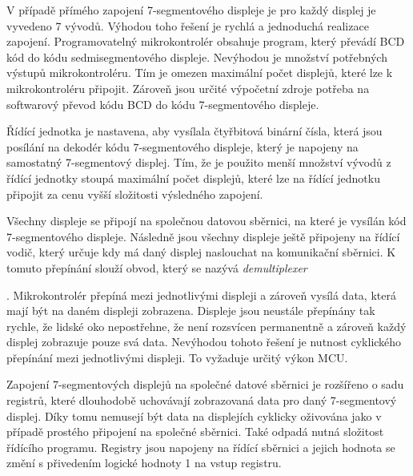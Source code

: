 {V případě přímého zapojení 7-segmentového displeje je pro každý displej je vyvedeno 7 vývodů. Výhodou toho řešení je rychlá a jednoduchá realizace zapojení. Programovatelný mikrokontrolér obsahuje program, který převádí BCD kód do kódu sedmisegmentového displeje. Nevýhodou je množství potřebných výstupů mikrokontroléru. Tím je omezen maximální počet displejů, které lze k mikrokontroléru připojit. Zároveň jsou určité výpočetní zdroje potřeba na softwarový převod kódu BCD do kódu 7-segmentového displeje. 

\vskip 4mm
\centerline{}
\vskip 4mm


Řídící jednotka je nastavena, aby vysílala čtyřbitová binární čísla, která jsou posílání na dekodér kódu 7-segmentového displeje, který je napojeny na samostatný 7-segmentový displej. Tím, že je použito menší množství vývodů z řídící jednotky stoupá maximální počet displejů, které lze na řídící jednotku připojit za cenu vyšší složitosti výsledného zapojení.

\vskip 4mm
\centerline{}
\vskip 4mm


Všechny displeje se připojí na společnou datovou sběrnici, na které je vysílán kód 7-segmentového displeje. Následně jsou všechny displeje ještě připojeny na řídící vodič, který určuje kdy má daný displej naslouchat na komunikační sběrnici. K tomuto přepínání slouží obvod, který se nazývá \it demultiplexer}. Mikrokontrolér přepíná mezi jednotlivými displeji a zároveň vysílá data, která mají být na daném displeji zobrazena. Displeje jsou neustále přepínány tak rychle, že lidské oko nepostřehne, že není rozsvícen permanentně a zároveň každý displej zobrazuje pouze svá data. Nevýhodou tohoto řešení je nutnost cyklického přepínání mezi jednotlivými displeji. To vyžaduje určitý výkon MCU.

\vskip 4mm
\centerline{}
\vskip 4mm


Zapojení 7-segmentových displejů na společné datové sběrnici je rozšířeno o sadu registrů, které dlouhodobě uchovávají zobrazovaná data pro daný 7-segmentový displej. Díky tomu nemusejí být data na displejích cyklicky oživována jako v případě prostého připojení na společné sběrnici. Také odpadá nutná složitost řídícího programu. Registry jsou napojeny na řídící sběrnici a jejich hodnota se změní s přivedením logické hodnoty 1 na vstup registru.

